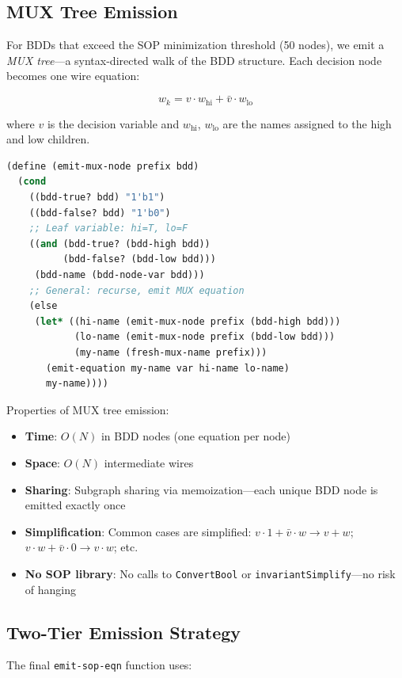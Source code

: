 \documentclass[11pt]{article}
\begin{document}
\subsection{MUX Tree Emission}

For BDDs that exceed the SOP minimization threshold (50 nodes), we
emit a \emph{MUX tree}---a syntax-directed walk of the BDD structure.
Each decision node becomes one wire equation:

\[
  w_k = v \cdot w_{\text{hi}} + \bar{v} \cdot w_{\text{lo}}
\]

where $v$ is the decision variable and $w_{\text{hi}}$, $w_{\text{lo}}$
are the names assigned to the high and low children.

\begin{lstlisting}[language=Lisp]
(define (emit-mux-node prefix bdd)
  (cond
    ((bdd-true? bdd) "1'b1")
    ((bdd-false? bdd) "1'b0")
    ;; Leaf variable: hi=T, lo=F
    ((and (bdd-true? (bdd-high bdd))
          (bdd-false? (bdd-low bdd)))
     (bdd-name (bdd-node-var bdd)))
    ;; General: recurse, emit MUX equation
    (else
     (let* ((hi-name (emit-mux-node prefix (bdd-high bdd)))
            (lo-name (emit-mux-node prefix (bdd-low bdd)))
            (my-name (fresh-mux-name prefix)))
       (emit-equation my-name var hi-name lo-name)
       my-name))))
\end{lstlisting}

Properties of MUX tree emission:
\begin{itemize}
\item \textbf{Time}: $O(N)$ in BDD nodes (one equation per node)
\item \textbf{Space}: $O(N)$ intermediate wires
\item \textbf{Sharing}: Subgraph sharing via memoization---each unique
  BDD node is emitted exactly once
\item \textbf{Simplification}: Common cases are simplified:
  $v \cdot 1 + \bar{v} \cdot w \to v + w$;
  $v \cdot w + \bar{v} \cdot 0 \to v \cdot w$; etc.
\item \textbf{No SOP library}: No calls to \texttt{ConvertBool} or
  \texttt{invariantSimplify}---no risk of hanging
\end{itemize}

\subsection{Two-Tier Emission Strategy}

The final \texttt{emit-sop-eqn} function uses:
\end{document}
